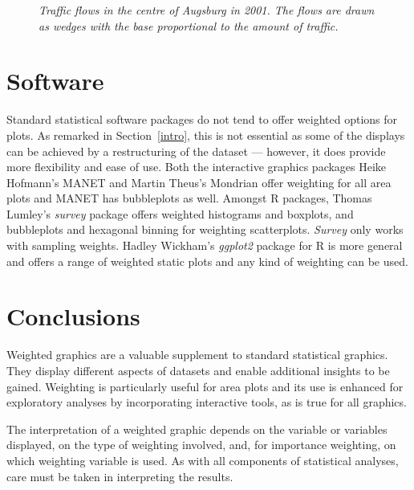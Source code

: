 \documentclass{svmult}
\begin{document}
\begin{figure}[htbp]
  \centering
  \caption{\label{traffic}\em Traffic flows in the centre of Augsburg in 2001. The flows are drawn as wedges with the base proportional to the amount of traffic. }
\end{figure}

\section{Software}
\label{sw}

Standard statistical software packages do not tend to offer weighted options for plots.  As remarked in Section~\ref{intro}, this is not essential as some of the displays can be achieved by a restructuring of the dataset --- however, it does provide more flexibility and ease of use.  Both the interactive graphics packages Heike Hofmann's MANET \citep{hofmann:2000a} and Martin Theus's Mondrian \citep{theus:2005} offer weighting for all area plots and MANET has bubbleplots as well.  Amongst R packages, Thomas Lumley's \textit{survey} \cite{survey} package offers weighted histograms and boxplots, and bubbleplots and hexagonal binning for weighting scatterplots.  \textit{Survey} only works with sampling weights.  Hadley Wickham's \textit{ggplot2} \cite{ggplot2} package for R is more general and offers a range of weighted static plots and any kind of weighting can be used.

\section{Conclusions}
\label{conc}
Weighted graphics are a valuable supplement to standard statistical graphics.  They display different aspects of datasets and enable additional insights to be gained.  Weighting is particularly useful for area plots and its use is enhanced for exploratory analyses by incorporating interactive tools, as is true for all graphics.

The interpretation of a weighted graphic depends on the variable or variables displayed, on the type of weighting involved, and, for importance weighting, on which weighting variable is used.  As with all components of statistical analyses, care must be taken in interpreting the results.

% 


\end{document}
